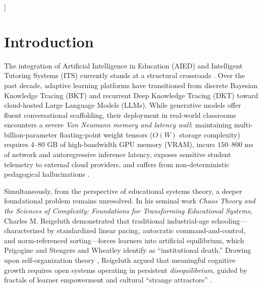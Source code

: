 \documentclass[10pt,twocolumn,a4paper]{article}
\begin{document}
\begin{@twocolumnfalse}
\begin{abstract}
      \noindent \textbf{Keywords:} Procedural Fractal Pedagogy; Artificial Intelligence in Education (AIED); Chaos and Complexity Theory; Reigeluth Systemic Transformation; Saturn School Paradox; Zone of Proximal Development (ZPD); Zero-Storage Neural Synthesis; Orbital Error Dynamics; Lean 4 Formal Verification.
    \end{abstract}
    \vspace{0.4cm}
  \end{@twocolumnfalse}
]

\section{Introduction}

The integration of Artificial Intelligence in Education (AIED) and Intelligent Tutoring Systems (ITS) currently stands at a structural crossroads \cite{hwang2020vision,kasneci2023chatgpt}. Over the past decade, adaptive learning platforms have transitioned from discrete Bayesian Knowledge Tracing (BKT) \cite{corbett1994knowledge} and recurrent Deep Knowledge Tracing (DKT) \cite{piech2015deep} toward cloud-hosted Large Language Models (LLMs). While generative models offer fluent conversational scaffolding, their deployment in real-world classrooms encounters a severe \textit{Von Neumann memory and latency wall}: maintaining multi-billion-parameter floating-point weight tensors ($O(W)$ storage complexity) requires $4\text{--}80\text{ GB}$ of high-bandwidth GPU memory (VRAM), incurs $150\text{--}800\text{ ms}$ of network and autoregressive inference latency, exposes sensitive student telemetry to external cloud providers, and suffers from non-deterministic pedagogical hallucinations \cite{dagli2026werr,dagli2026mandelbrot}.

Simultaneously, from the perspective of educational systems theory, a deeper foundational problem remains unresolved. In his seminal work \textit{Chaos Theory and the Sciences of Complexity: Foundations for Transforming Educational Systems}, Charles M. Reigeluth \cite{reigeluth2008chaos} demonstrated that traditional industrial-age schooling—characterized by standardized linear pacing, autocratic command-and-control, and norm-referenced sorting—forces learners into artificial equilibrium, which Prigogine and Stengers \cite{prigogine1984order} and Wheatley \cite{wheatley1999leadership} identify as ``institutional death.'' Drawing upon self-organization theory \cite{jantsch1980self}, Reigeluth argued that meaningful cognitive growth requires open systems operating in persistent \textit{disequilibrium}, guided by fractals of learner empowerment and cultural ``strange attractors'' \cite{reigeluth2008chaos}.
\end{document}
